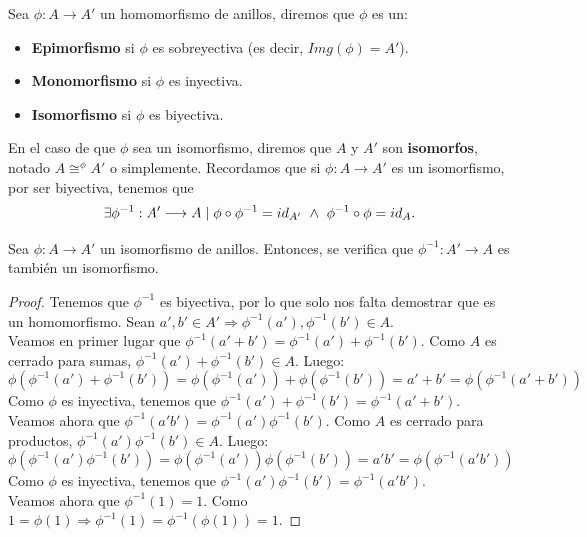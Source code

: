 \begin{definicion}
    Sea $\phi:A\longrightarrow A'$ un homomorfismo de anillos, diremos que $\phi$ es un:
    \begin{itemize}
        \item \textbf{Epimorfismo} si $\phi$ es sobreyectiva (es decir, $Img(\phi)=A'$).
        \item \textbf{Monomorfismo} si $\phi$ es inyectiva.
        \item \textbf{Isomorfismo} si $\phi$ es biyectiva.
    \end{itemize}
\end{definicion}

En el caso de que $\phi$ sea un isomorfismo, diremos que $A$ y $A'$ son \textbf{isomorfos}, notado $\displaystyle A \mathop{\cong}^{\phi} A'$ o simplemente. Recordamos que si $\phi:A\longrightarrow A'$ es un isomorfismo, por ser biyectiva, tenemos que $$\exists \phi^{-1}:A' \longrightarrow A
    \mid \phi \circ \phi^{-1} = id_{A'} \ \land \  \phi^{-1} \circ \phi = id_A.$$
    
\begin{prop}
    Sea $\phi:A\longrightarrow A'$ un isomorfismo de anillos. Entonces, se verifica que $\phi^{-1}:A'\longrightarrow A$ es también un isomorfismo.
\end{prop}
\begin{proof}
    Tenemos que $\phi^{-1}$ es biyectiva, por lo que solo nos falta demostrar que es un homomorfismo. Sean $a',b' \in A' \Longrightarrow \phi^{-1}(a'),\phi^{-1}(b') \in A$.\\

    Veamos en primer lugar que $\phi^{-1}(a'+b') = \phi^{-1}(a') + \phi^{-1}(b')$. Como $A$ es cerrado para sumas, $\phi^{-1}(a') + \phi^{-1}(b') \in A$. Luego:
    $$\phi(\phi^{-1}(a') + \phi^{-1}(b')) = \phi(\phi^{-1}(a')) + \phi(\phi^{-1}(b')) = a' + b' = \phi(\phi^{-1}(a'+b'))$$
    Como $\phi$ es inyectiva, tenemos que $\phi^{-1}(a')+\phi^{-1}(b') = \phi^{-1}(a'+b')$.\\
    
    Veamos ahora que $\phi^{-1}(a'b')=\phi^{-1}(a')\phi^{-1}(b')$. Como $A$ es cerrado para productos, $\phi^{-1}(a')\phi^{-1}(b') \in A$. Luego:
    $$\phi(\phi^{-1}(a')\phi^{-1}(b')) = \phi(\phi^{-1}(a'))\phi(\phi^{-1}(b')) = a'b' = \phi(\phi^{-1}(a'b'))$$
    Como $\phi$ es inyectiva, tenemos que $\phi^{-1}(a')\phi^{-1}(b') = \phi^{-1}(a'b')$.\\

    Veamos ahora que $\phi^{-1}(1)=1$. Como $1 = \phi(1) \Longrightarrow \phi^{-1}(1) = \phi^{-1}(\phi(1)) = 1$.
\end{proof}


